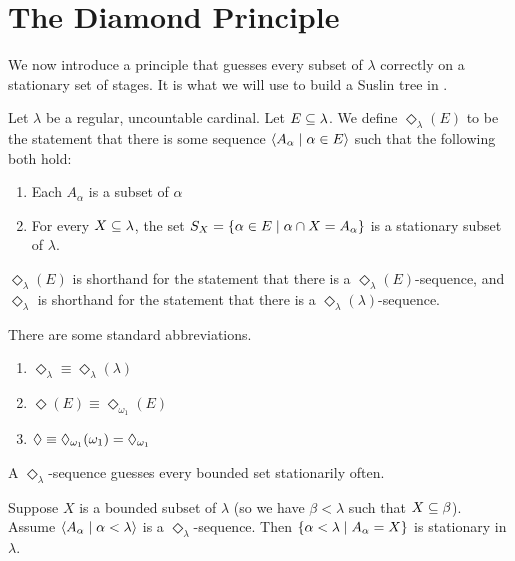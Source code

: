 \section{The Diamond Principle}

We now introduce a principle that guesses every subset of $\lambda$ correctly on a stationary set of stages. It is what we will use to build a Suslin tree in .

\begin{boxdefinition}[$\Diamond$]
    Let $\lambda$ be a regular, uncountable cardinal. Let $E \subseteq \lambda$. We define \textbf{$\Diamond_{\lambda}(E)$} to be the statement that there is some sequence $\left\langle A_{\alpha} \; \middle| \; \alpha \in E \right\rangle$ such that the following both hold:
    \begin{enumerate}
        \item Each $A_{\alpha}$ is a subset of $\alpha$
        \item For every $X \subseteq \lambda$, the set $S_X = \left\{ \alpha \in E \; \middle\vert \; \alpha \cap X = A_{\alpha} \right\}$ is a stationary subset of $\lambda$.
    \end{enumerate}
    $\Diamond_{\lambda}(E)$ is shorthand for the statement that there is a $\Diamond_{\lambda}(E)$-sequence, and $\Diamond_{\lambda}$ is shorthand for the statement that there is a $\Diamond_{\lambda}(\lambda)$-sequence.
\end{boxdefinition}

There are some standard abbreviations.

\begin{boxnotation}\hfill
    \begin{enumerate}
        \item $\Diamond_{\lambda} \equiv \Diamond_{\lambda}(\lambda)$
        \item $\Diamond(E) \equiv  \Diamond_{\omega_1}(E)$
        \item $\Diamond \equiv \Diamond_{\omega_1}\!\left( \omega_1 \right) = \Diamond_{\omega_1}$
    \end{enumerate}
\end{boxnotation}

A $\Diamond_{\lambda}$-sequence guesses every bounded set stationarily often.

\begin{boxlemma}
    Suppose $X$ is a bounded subset of $\lambda$ (so we have $\beta < \lambda$ such that $X \subseteq \beta$). Assume $\left\langle A_{\alpha} \; \middle| \; \alpha < \lambda \right\rangle$ is a $\Diamond_{\lambda}$-sequence. Then $\left\{ \alpha < \lambda \; \middle\vert \; A_{\alpha} = X \right\}$ is stationary in $\lambda$.
\end{boxlemma}

